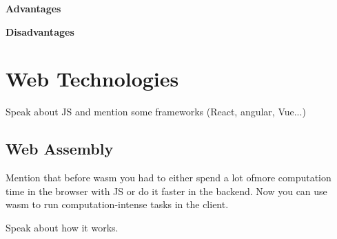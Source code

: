 \textbf{Advantages}

\textbf{Disadvantages}

\section{Web Technologies}
Speak about JS and mention some frameworks (React, angular, Vue...)

\subsection{Web Assembly}
Mention that before wasm you had to either spend a lot ofmore computation time in the browser with JS or do it faster in the backend. Now you can use wasm to run computation-intense tasks in the client.

Speak about how it works.